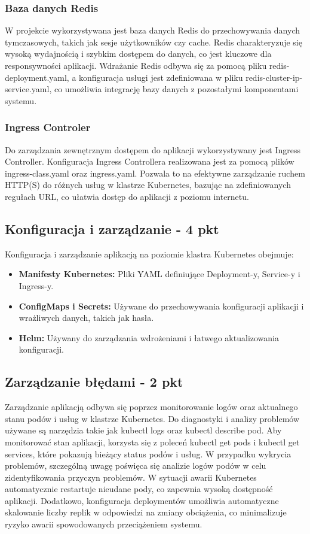 \documentclass[12pt,a4paper]{article}
\begin{document}
\subsubsection{Baza danych Redis}
W projekcie wykorzystywana jest baza danych Redis do przechowywania danych tymczasowych, takich jak sesje użytkowników czy cache. Redis charakteryzuje się wysoką wydajnością i szybkim dostępem do danych, co jest kluczowe dla responsywności aplikacji. Wdrażanie Redis odbywa się za pomocą pliku redis-deployment.yaml, a konfiguracja usługi jest zdefiniowana w pliku redis-cluster-ip-service.yaml, co umożliwia integrację bazy danych z pozostałymi komponentami systemu.

\subsubsection{Ingress Controler}
Do zarządzania zewnętrznym dostępem do aplikacji wykorzystywany jest Ingress Controller. Konfiguracja Ingress Controllera realizowana jest za pomocą plików ingress-class.yaml oraz ingress.yaml. Pozwala to na efektywne zarządzanie ruchem HTTP(S) do różnych usług w klastrze Kubernetes, bazując na zdefiniowanych regułach URL, co ułatwia dostęp do aplikacji z poziomu internetu.



\subsection{Konfiguracja i zarządzanie - 4 pkt}
\label{sec:NonFunctionalConditions}
Konfiguracja i zarządzanie aplikacją na poziomie klastra Kubernetes obejmuje:
\begin{itemize}
    \item \textbf{Manifesty Kubernetes:} Pliki YAML definiujące Deployment-y, Service-y i Ingress-y.
    \item \textbf{ConfigMaps i Secrets:} Używane do przechowywania konfiguracji aplikacji i wrażliwych danych, takich jak hasła.
    \item \textbf{Helm:} Używany do zarządzania wdrożeniami i łatwego aktualizowania konfiguracji.
\end{itemize}

\subsection{Zarządzanie błędami - 2 pkt}
\label{sec:ERD} 
Zarządzanie aplikacją odbywa się poprzez monitorowanie logów oraz aktualnego stanu podów i usług w klastrze Kubernetes. Do diagnostyki i analizy problemów używane są narzędzia takie jak kubectl logs oraz kubectl describe pod. Aby monitorować stan aplikacji, korzysta się z poleceń kubectl get pods i kubectl get services, które pokazują bieżący status podów i usług. W przypadku wykrycia problemów, szczególną uwagę poświęca się analizie logów podów w celu zidentyfikowania przyczyn problemów. W sytuacji awarii Kubernetes automatycznie restartuje nieudane pody, co zapewnia wysoką dostępność aplikacji. Dodatkowo, konfiguracja deploymentów umożliwia automatyczne skalowanie liczby replik w odpowiedzi na zmiany obciążenia, co minimalizuje ryzyko awarii spowodowanych przeciążeniem systemu.
\end{document}
